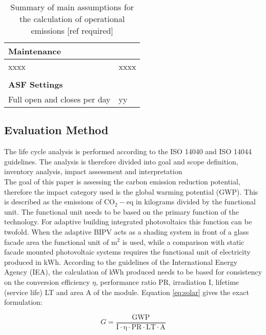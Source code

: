 \begin{table}[H]
\begin{tabular}{ll}
\textbf{Maintenance}          &                                                \\
\hline
xxxx                          & xxxx                                           \\
                              &                                                \\

\textbf{ASF Settings}         &                                                \\
\hline
Full open and closes per day  &   yy                                           \\
\hline
\end{tabular}
\caption{Summary of main assumptions for the calculation of operational emissions [ref required]}
\label{tab:AssumptionsOpp}
\end{table}



\subsection{Evaluation Method}
The life cycle analysis is performed according to the ISO 14040 and ISO 14044 guidelines. The analysis is therefore divided into goal and scope definition, inventory analysis, impact assessment and interpretation\\ %

The goal of this paper is assessing the carbon emission reduction potential, therefore the impact category used is the global warming potential (GWP). This is described as the emissions of ${\mathrm{CO_2-eq}}$ in kilograms divided by the functional unit. The functional unit needs to be based on the primary function of the technology. For adaptive building integrated photovoltaics this function can be twofold. When the adaptive BIPV acts as a shading system in front of a glass facade area the functional unit of ${\mathrm{m^2}}$ is used, while a comparison with static facade mounted photovoltaic systems requires the functional unit of electricity produced in ${\mathrm{kWh}}$. According to the guidelines of the International Energy Agency (IEA), the calculation of kWh produced needs to be based for consistency on the conversion efficiency ${\eta}$, performance ratio PR, irradiation I, lifetime (service life) LT and area A of the module. Equation \ref{eq:solar} gives the exact formulation:
	
\begin{equation}
G=\frac{{\mathrm{GWP}}}{{\mathrm{I \cdot \eta  \cdot PR \cdot LT \cdot A}}}
\label{eq:solar}
\end{equation}

